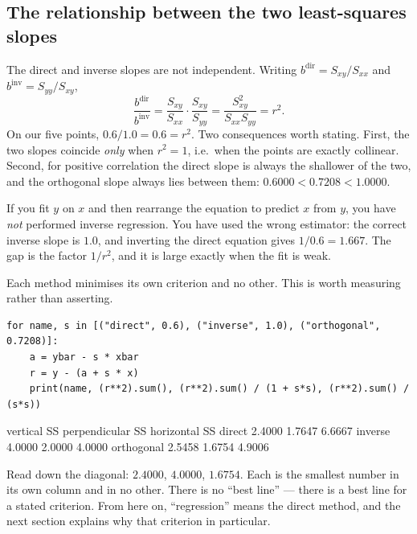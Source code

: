 \documentclass[11pt]{article}
\begin{document}
\subsection{The relationship between the two least-squares slopes}

The direct and inverse slopes are not independent. Writing
$b^{\mathrm{dir}} = S_{xy}/S_{xx}$ and $b^{\mathrm{inv}} = S_{yy}/S_{xy}$,
\[
  \frac{b^{\mathrm{dir}}}{b^{\mathrm{inv}}}
    = \frac{S_{xy}}{S_{xx}} \cdot \frac{S_{xy}}{S_{yy}}
    = \frac{S_{xy}^2}{S_{xx}S_{yy}}
    = r^2 .
\]
On our five points, $0.6/1.0 = 0.6 = r^2$. Two consequences worth stating.
First, the two slopes coincide \emph{only} when $r^2 = 1$, i.e.\ when the
points are exactly collinear. Second, for positive correlation the direct
slope is always the shallower of the two, and the orthogonal slope always lies
between them: $0.6000 < 0.7208 < 1.0000$.

\begin{caution}
If you fit $y$ on $x$ and then rearrange the equation to predict $x$ from $y$,
you have \emph{not} performed inverse regression. You have used the wrong
estimator: the correct inverse slope is $1.0$, and inverting the direct
equation gives $1/0.6 = 1.667$. The gap is the factor $1/r^2$, and it is large
exactly when the fit is weak.
\end{caution}

Each method minimises its own criterion and no other. This is worth measuring
rather than asserting.

\begin{lstlisting}
for name, s in [("direct", 0.6), ("inverse", 1.0), ("orthogonal", 0.7208)]:
    a = ybar - s * xbar
    r = y - (a + s * x)
    print(name, (r**2).sum(), (r**2).sum() / (1 + s*s), (r**2).sum() / (s*s))
\end{lstlisting}
\begin{codeout}
              vertical SS   perpendicular SS   horizontal SS
   direct        2.4000            1.7647          6.6667
   inverse       4.0000            2.0000          4.0000
   orthogonal    2.5458            1.6754          4.9006
\end{codeout}

Read down the diagonal: $2.4000$, $4.0000$, $1.6754$. Each is the smallest
number in its own column and in no other. There is no ``best line'' --- there
is a best line for a stated criterion. From here on, ``regression'' means the
direct method, and the next section explains why that criterion in particular.
\end{document}
